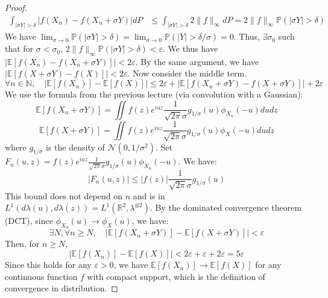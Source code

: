 \begin{proof}
\begin{align*}
    \int_{|\sigma Y| > \delta} |f(X_n) - f(X_n + \sigma Y)| dP &\leq \int_{|\sigma Y| > \delta} 2\|f\|_{\infty} dP = 2\|f\|_{\infty} \mathbb{P}(|\sigma Y| > \delta)
\end{align*}
We have $\lim_{\sigma \to 0} \mathbb{P}(|\sigma Y| > \delta) = \lim_{\sigma \to 0} \mathbb{P}(|Y| > \delta/\sigma) = 0$. Thus, $\exists \sigma_0$ such that for $\sigma < \sigma_0$, $2\|f\|_{\infty} \mathbb{P}(|\sigma Y| > \delta) < \varepsilon$. We thus have $|\mathbb{E}[f(X_n) - f(X_n + \sigma Y)]| < 2\varepsilon$. By the same argument, we have $|\mathbb{E}[f(X + \sigma Y) - f(X)]| < 2\varepsilon$. Now consider the middle term.
\[
\forall n \in \mathbb{N}, \quad |\mathbb{E}[f(X_n)] - \mathbb{E}[f(X)]| \leq 2\varepsilon + |\mathbb{E}[f(X_n + \sigma Y) - f(X + \sigma Y)]| + 2\varepsilon
\]
We use the formula from the previous lecture (via convolution with a Gaussian):
\[
\mathbb{E}[f(X_n + \sigma Y)] = \iint f(z) e^{iuz} \frac{1}{\sqrt{2\pi}\sigma} g_{1/\sigma}(u) \phi_{X_n}(-u) du dz
\]
\[
\mathbb{E}[f(X + \sigma Y)] = \iint f(z) e^{iuz} \frac{1}{\sqrt{2\pi}\sigma} g_{1/\sigma}(u) \phi_{X}(-u) du dz
\]
where $g_{1/\sigma}$ is the density of $\mathcal{N}(0, 1/\sigma^2)$. Set $F_n(u,z) = f(z) e^{iuz} \frac{1}{\sqrt{2\pi}\sigma} g_{1/\sigma}(u) \phi_{X_n}(-u)$. We have:
\[
|F_n(u,z)| \leq |f(z)| \frac{1}{\sqrt{2\pi}\sigma} g_{1/\sigma}(u)
\]
This bound does not depend on $n$ and is in $L^1(d\lambda(u), d\lambda(z)) = L^1(\mathbb{R}^2, \lambda^{\otimes 2})$. By the dominated convergence theorem (DCT), since $\phi_{X_n}(u) \to \phi_X(u)$, we have:
\[
\exists N, \forall n \geq N, \quad |\mathbb{E}[f(X_n + \sigma Y)] - \mathbb{E}[f(X + \sigma Y)]| < \varepsilon
\]
Then, for $n \geq N$,
\[
|\mathbb{E}[f(X_n)] - \mathbb{E}[f(X)]| < 2\varepsilon + \varepsilon + 2\varepsilon = 5\varepsilon
\]
Since this holds for any $\varepsilon > 0$, we have $\mathbb{E}[f(X_n)] \to \mathbb{E}[f(X)]$ for any continuous function $f$ with compact support, which is the definition of convergence in distribution.
\end{proof}%
